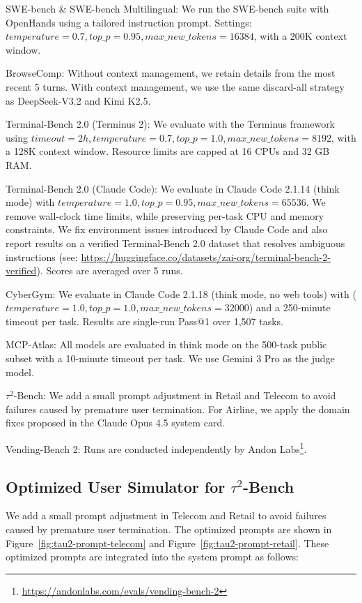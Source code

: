 \documentclass{article}
\theoremstyle{definition}
\begin{document}
SWE-bench \& SWE-bench Multilingual: We run the SWE-bench suite with OpenHands using a tailored instruction prompt. Settings: $temperature=0.7, top\_p=0.95, max\_new\_tokens=16384$, with a 200K context window.

BrowseComp: Without context management, we retain details from the most recent 5 turns. With context management, we use the same discard-all strategy as DeepSeek-V3.2 and Kimi K2.5.

Terminal-Bench 2.0 (Terminus 2): We evaluate with the Terminus framework using $timeout=2h, temperature=0.7, top\_p=1.0, max\_new\_tokens=8192$, with a 128K context window. Resource limits are capped at 16 CPUs and 32 GB RAM.

Terminal-Bench 2.0 (Claude Code): We evaluate in Claude Code 2.1.14 (think mode) with $temperature=1.0, top\_p=0.95, max\_new\_tokens=65536$. We remove wall-clock time limits, while preserving per-task CPU and memory constraints. We fix environment issues introduced by Claude Code and also report results on a verified Terminal-Bench 2.0 dataset that resolves ambiguous instructions (see: \url{https://huggingface.co/datasets/zai-org/terminal-bench-2-verified}). Scores are averaged over 5 runs.

CyberGym: We evaluate in Claude Code 2.1.18 (think mode, no web tools) with ($temperature=1.0, top\_p=1.0, max\_new\_tokens=32000$) and a 250-minute timeout per task. Results are single-run Pass@1 over 1,507 tasks.

MCP-Atlas: All models are evaluated in think mode on the 500-task public subset with a 10-minute timeout per task. We use Gemini 3 Pro as the judge model.

$\tau^2$-Bench: We add a small prompt adjustment in Retail and Telecom to avoid failures caused by premature user termination. For Airline, we apply the domain fixes proposed in the Claude Opus 4.5 system card.

Vending-Bench 2: Runs are conducted independently by Andon Labs\footnote{\url{https://andonlabs.com/evals/vending-bench-2}}.

\subsection{Optimized User Simulator for $\tau^2$-Bench}
\label{sec:tau_user_prompt}
We add a small prompt adjustment in Telecom and Retail to avoid failures caused by premature user termination. The optimized prompts are shown in Figure~\ref{fig:tau2-prompt-telecom} and Figure~\ref{fig:tau2-prompt-retail}. These optimized prompts are integrated into the system prompt as follows:
\end{document}
